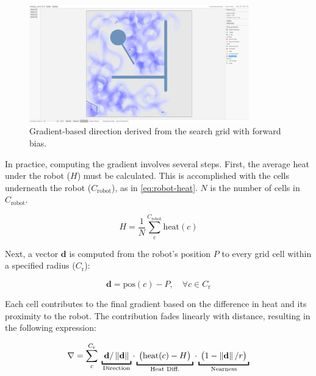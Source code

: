 \begin{figure}[H]
    \begin{center}
        \includegraphics[width=0.85\textwidth]{./figures/screenshots/with-forward.png}
    \end{center}
    \caption{Gradient-based direction derived from the search grid with forward bias.}
    \label{fig:search-gradient-forward}
\end{figure}

In practice, computing the gradient involves several steps. First, the average heat under the robot ($H$) must be calculated. This is accomplished with the cells underneath the robot ($C_\mathrm{robot}$), as in \cref{eq:robot-heat}. $N$ is the number of cells in $C_\mathrm{robot}$.

\begin{equation}
\label{eq:robot-heat}
    H = \frac{1}{N} \sum_c^{C_\mathrm{robot}} \mathrm{heat}(c)
\end{equation}

Next, a vector $\mathbf{d}$ is computed from the robot's position $P$ to every grid cell within a specified radius ($C_\mathrm{r}$):

\begin{equation}
    \mathbf{d} = \mathrm{pos}(c) - P, \quad \forall c \in C_\mathrm{r}
\end{equation}

Each cell contributes to the final gradient based on the difference in heat and its proximity to the robot. The contribution fades linearly with distance, resulting in the following expression:

\begin{equation}
    \nabla = \sum_c^{C_\mathrm{r}} \;
    \underbracket{\; \mathbf{d}/\norm{\mathbf{d}}      \;}_\text{\makebox[0pt]{Direction}} \cdot
    \underbracket{\; \big(\mathrm{heat}(c) - H\big)    \;}_\text{Heat Diff.} \cdot
    \underbracket{\; \big(1 - \norm{\mathbf{d}}/r\big) \;}_\text{Nearness}
    \label{eq:fade-gradient}
\end{equation}

